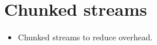 \clearpage{}
\section{Chunked streams}

\begin{itemize}
\item Chunked streams to reduce overhead.
\end{itemize}
